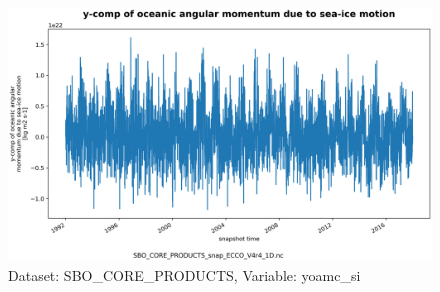 \begin{figure}[H]
\centering
\includegraphics[scale=0.55]{../images/plots/oneD_plots/SBO_Core_Products/yoamc_si.png}
\caption{Dataset: SBO\_CORE\_PRODUCTS, Variable: yoamc\_si}
\label{tab:table-SBO_CORE_PRODUCTS_yoamc_si-Plot}
\end{figure}
\newpage
\pagebreak
